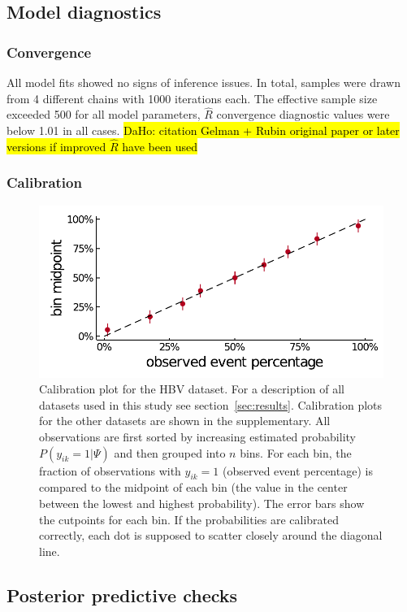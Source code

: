 \documentclass{bioinfo}
\begin{document}
\subsection{Model diagnostics}
\subsubsection{Convergence}
 All model fits showed no signs of inference issues. In total, samples were drawn from 4 different chains with 1000 iterations each. The effective sample size exceeded 500 for all model parameters, \(\hat{R}\) convergence diagnostic values were below 1.01 in all cases. \hl{DaHo: citation Gelman + Rubin original paper or later versions if improved $\hat{R}$ have been used}

\subsubsection{Calibration}
 \begin{figure}[!ht]
  \includegraphics[width=1\linewidth]{plots/phylogeny_calibration.pdf}
  \caption{Calibration plot for the HBV dataset. For a description of all datasets used in this study see section~\ref{sec:results}. Calibration plots for the other datasets are shown in the supplementary.
  All observations are first sorted by increasing estimated probability \(P(y_{ik}=1|\Psi)\) and then grouped into \(n\) bins.
  For each bin, the fraction of observations with \(y_{ik}=1\) (observed event percentage) is compared to the midpoint of each bin (the value in the center between the lowest and highest probability). The error bars show the cutpoints for each bin. If the probabilities are calibrated correctly, each dot is supposed to scatter closely around the diagonal line.}
  \label{fig:phylogeny-calibration}
\end{figure}

\subsection*{Posterior predictive checks}
\end{document}
